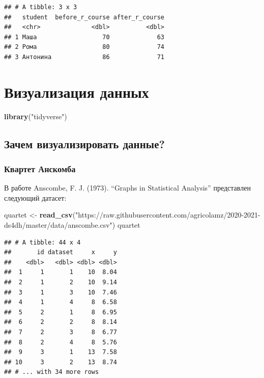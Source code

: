 \documentclass[
]{book}
\newenvironment{Shaded}{\begin{snugshade}}{\end{snugshade}}
\newcommand{\KeywordTok}[1]{\textcolor[rgb]{0.13,0.29,0.53}{\textbf{#1}}}
\newcommand{\NormalTok}[1]{#1}
\newcommand{\StringTok}[1]{\textcolor[rgb]{0.31,0.60,0.02}{#1}}
\begin{document}
\begin{verbatim}
## # A tibble: 3 x 3
##   student  before_r_course after_r_course
##   <chr>              <dbl>          <dbl>
## 1 Маша                  70             63
## 2 Рома                  80             74
## 3 Антонина              86             71
\end{verbatim}

\hypertarget{viz_1}{%
\chapter{Визуализация данных}\label{viz_1}}

\begin{Shaded}
\begin{Highlighting}[]
\KeywordTok{library}\NormalTok{(}\StringTok{"tidyverse"}\NormalTok{)}
\end{Highlighting}
\end{Shaded}

\hypertarget{ux437ux430ux447ux435ux43c-ux432ux438ux437ux443ux430ux43bux438ux437ux438ux440ux43eux432ux430ux442ux44c-ux434ux430ux43dux43dux44bux435}{%
\section{Зачем визуализировать данные?}\label{ux437ux430ux447ux435ux43c-ux432ux438ux437ux443ux430ux43bux438ux437ux438ux440ux43eux432ux430ux442ux44c-ux434ux430ux43dux43dux44bux435}}

\hypertarget{ux43aux432ux430ux440ux442ux435ux442-ux430ux43dux441ux43aux43eux43cux431ux430}{%
\subsection{Квартет Анскомба}\label{ux43aux432ux430ux440ux442ux435ux442-ux430ux43dux441ux43aux43eux43cux431ux430}}

В работе Anscombe, F. J. (1973). ``Graphs in Statistical Analysis'' представлен следующий датасет:

\begin{Shaded}
\begin{Highlighting}[]
\NormalTok{quartet <-}\StringTok{ }\KeywordTok{read_csv}\NormalTok{(}\StringTok{"https://raw.githubusercontent.com/agricolamz/2020-2021-ds4dh/master/data/anscombe.csv"}\NormalTok{)}
\NormalTok{quartet}
\end{Highlighting}
\end{Shaded}

\begin{verbatim}
## # A tibble: 44 x 4
##       id dataset     x     y
##    <dbl>   <dbl> <dbl> <dbl>
##  1     1       1    10  8.04
##  2     1       2    10  9.14
##  3     1       3    10  7.46
##  4     1       4     8  6.58
##  5     2       1     8  6.95
##  6     2       2     8  8.14
##  7     2       3     8  6.77
##  8     2       4     8  5.76
##  9     3       1    13  7.58
## 10     3       2    13  8.74
## # ... with 34 more rows
\end{verbatim}
\end{document}
